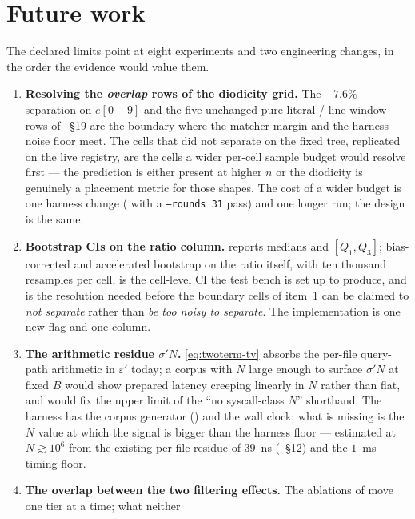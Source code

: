 \documentclass[11pt,letterpaper]{article}
\begin{document}
\section{Future work}
\label{sec:future}
The declared limits point at eight experiments and two engineering
changes, in the order the evidence would value them.
\begin{enumerate}[leftmargin=*,itemsep=1pt,topsep=2pt]
\item \textbf{Resolving the \emph{overlap} rows of the diodicity grid.}
  The $+7.6\%$ separation on $e[0-9]$ and the five unchanged
  pure-literal / line-window rows of ~\S 19
  are the boundary where the matcher margin and the harness noise floor
  meet. The cells that did not separate on the fixed tree, replicated on
  the live registry, are the cells a wider per-cell sample budget would
  resolve first --- the prediction is either present at higher $n$ or
  the diodicity is genuinely a placement metric for those shapes. The
  cost of a wider budget is one harness change
  ( with a \texttt{--rounds 31} pass) and one
  longer run; the design is the same.
\item \textbf{Bootstrap CIs on the ratio column.} 
  reports medians and $[Q_1,Q_3]$; bias-corrected and accelerated
  bootstrap on the ratio itself, with ten thousand resamples per cell, is
  the cell-level CI the test bench is set up to produce, and is the
  resolution needed before the boundary cells of item~1 can be claimed
  to \emph{not separate} rather than \emph{be too noisy to separate}.
  The implementation is one new  flag and one
   column.
\item \textbf{The arithmetic residue $\sigma' N$.} \eqref{eq:twoterm-tv}
  absorbs the per-file query-path arithmetic in $\varepsilon'$ today; a
  corpus with $N$ large enough to surface $\sigma' N$ at fixed $B$ would
  show prepared latency creeping linearly in $N$ rather than flat, and
  would fix the upper limit of the ``no syscall-class $N$'' shorthand.
  The harness has the corpus generator ()
  and the wall clock; what is missing is the $N$ value at which the
  signal is bigger than the harness floor --- estimated at $N \gtrsim
  10^{6}$ from the existing per-file residue of $39$~ns
  (~\S 12) and the $1$~ms timing floor.
\item \textbf{The overlap between the two filtering effects.} The
  ablations of  move one tier at a time; what neither

\end{enumerate}
\end{document}
